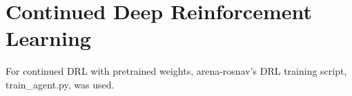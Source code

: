 \section{Continued Deep Reinforcement Learning}
For continued DRL with pretrained weights, arena-rosnav’s DRL training script, train\_agent.py, was used.


